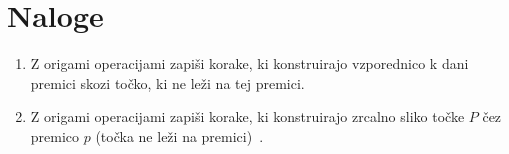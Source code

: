 \section{Naloge}

\begin{enumerate}
    \item Z origami operacijami zapiši korake, ki konstruirajo vzporednico k dani premici skozi točko, ki ne leži na tej premici.
    \item Z origami operacijami zapiši korake, ki konstruirajo zrcalno sliko točke $P$ čez premico $p$ (točka ne leži na premici)~\cite[rešitev na str.\ 28]{hull2020}.
\end{enumerate}